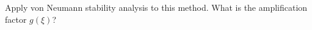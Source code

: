 Apply von Neumann stability analysis to this method. What is the amplification factor $g(\xi)$?

\begin{solution}\ \\\\
    \hfill\vfill
    \ \\
\end{solution}
